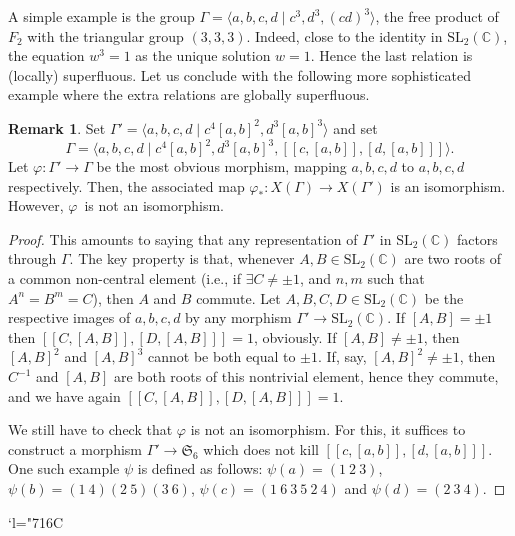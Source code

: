 \documentclass[11pt]{article}
\newcommand{\ie}{i.e.,\xspace}
\newcommand{\Changelback}{\mathcode`l="716C}
\theoremstyle{definition}
\newtheorem{remark}[theorem]{Remark}
\newcommand{\CC}{\mathbb{C}}
\newcommand{\SL}{\mathrm{SL}}
\begin{document}
A simple example is the group
$\Gamma=\langle a,b,c,d\mid c^3,d^3,(cd)^3\rangle$, the free product of~$F_2$ with the triangular group $(3,3,3)$. Indeed, close to the identity
in $\SL_2(\CC)$, the equation $w^3=1$ as the unique solution $w=1$.
Hence the last relation is (locally) superfluous. Let us conclude with the
following more sophisticated example where the extra relations are globally
superfluous.

\begin{remark}
Set $\Gamma'=\langle a,b,c,d\mid c^4[a,b]^2, d^3[a,b]^3\rangle$ and set
\[ \Gamma=\langle a,b,c,d\mid c^4[a,b]^2, d^3[a,b]^3,
[[ c,[a,b]],[d,[a,b]]]\rangle. \]
Let $\varphi\colon\Gamma'\to\Gamma$ be the most obvious morphism,
mapping $a,b,c,d$ to $a,b,c,d$ respectively.
Then, the associated map $\varphi_*\colon X(\Gamma)\to X(\Gamma')$
is an isomorphism. However, $\varphi$~is not an isomorphism.
\end{remark}

\begin{proof}
This amounts to saying that any representation of $\Gamma'$ in $\SL_2(\CC)$
factors through $\Gamma$. The key property is that, whenever
$A,B\in\SL_2(\CC)$ are two roots of a common non-central element
(\ie if $\exists C\neq \pm1$, and $n,m$ such that $A^n=B^m=C$),
then $A$ and $B$ commute. Let $A,B,C,D\in\SL_2(\CC)$ be the respective
images of $a,b,c,d$ by any morphism $\Gamma'\to\SL_2(\CC)$. If $[A,B]=\pm1$
then $[[ C,[A,B]],[D,[A,B]]]=1$, obviously.
If $[A,B]\neq \pm1$, then $[A,B]^2$ and $[A,B]^3$ cannot be both equal
to $\pm 1$. If, say, $[A,B]^2\neq \pm 1$, then
$C^{-1}$ and $[A,B]$ are both roots of this nontrivial element, hence they
commute, and we have again $[[ C,[A,B]],[D,[A,B]]]=1$.

We still have to check that $\varphi$ is not an isomorphism. For this, it
suffices to construct a morphism $\Gamma'\to \mathfrak{S}_6$
which does not kill
$[[ c,[a,b]],[d,[a,b]]]$. One such example $\psi$ is defined as follows:
$\psi(a)=(1~2~3)$, $\psi(b)=(1~4)(2~5)(3~6)$, $\psi(c)=(1~6~3~5~2~4)$
and $\psi(d)=(2~3~4)$.
\end{proof}

\Changelback

\end{document}
